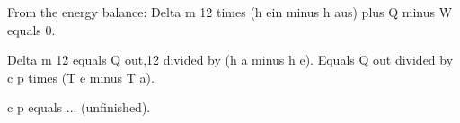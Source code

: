 From the energy balance:  
Delta m 12 times (h ein minus h aus) plus Q minus W equals 0.  

Delta m 12 equals Q out,12 divided by (h a minus h e).  
Equals Q out divided by c p times (T e minus T a).  

c p equals ... (unfinished).